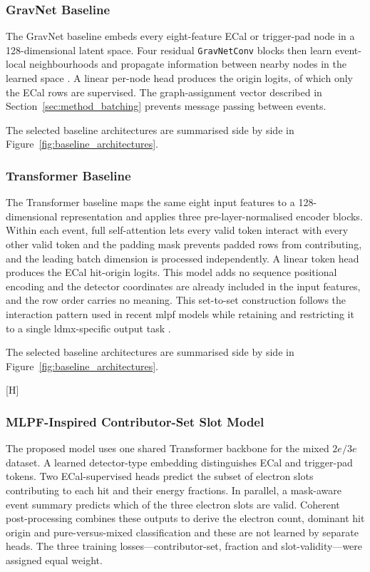 \subsubsection{GravNet Baseline}

The GravNet baseline embeds every eight-feature ECal or trigger-pad node in a
128-dimensional latent space. Four residual \texttt{GravNetConv} blocks then
learn event-local neighbourhoods and propagate information between nearby
nodes in the learned space \cite{qasim2019-gravnet}. A linear per-node head
produces the origin logits, of which only the ECal rows are supervised. The
graph-assignment vector described in
Section~\ref{sec:method_batching} prevents message passing between events.

The selected baseline architectures are summarised side by side in
Figure~\ref{fig:baseline_architectures}.

\subsubsection{Transformer Baseline}

The Transformer baseline maps the same eight input features to a
128-dimensional representation and applies three pre-layer-normalised
encoder blocks. Within each event, full self-attention lets every valid token
interact with every other valid token and the padding mask prevents padded rows
from contributing, and the leading batch dimension is processed
independently. A linear token head produces the ECal hit-origin logits. This
model adds no sequence positional encoding and the detector coordinates are already
included in the input features, and the row order carries no meaning. This
set-to-set construction follows the interaction pattern used in recent
\gls{mlpf} models while retaining and restricting it to a single \gls{ldmx}-specific output task
\cite{pata2026-mlpf}.

The selected baseline architectures are summarised side by side in
Figure~\ref{fig:baseline_architectures}.

[H]


\subsubsection{MLPF-Inspired Contributor-Set Slot Model}

The proposed model uses one shared Transformer backbone for the mixed
\(2e/3e\) dataset. A learned detector-type embedding distinguishes ECal and
trigger-pad tokens. Two ECal-supervised heads predict the subset of electron
slots contributing to each hit and their energy fractions. In parallel, a
mask-aware event summary predicts which of the three electron slots are
valid. Coherent post-processing combines these outputs to derive the electron
count, dominant hit origin and pure-versus-mixed classification and these are
not learned by separate heads. The three training losses---contributor-set,
fraction and slot-validity---were assigned equal weight.

